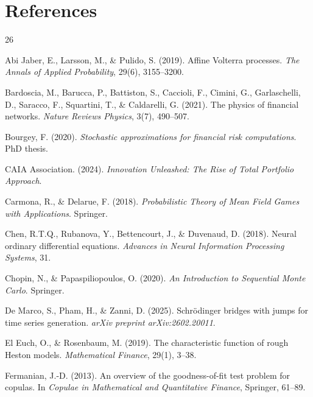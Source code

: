 \documentclass[11pt,a4paper]{article}
\begin{document}
\section*{References}
\renewcommand{\section}[2]{}

\begin{thebibliography}{26}

Abi Jaber, E., Larsson, M., \& Pulido, S. (2019).
Affine Volterra processes.
\emph{The Annals of Applied Probability}, 29(6), 3155--3200.

Bardoscia, M., Barucca, P., Battiston, S., Caccioli, F., Cimini, G.,
Garlaschelli, D., Saracco, F., Squartini, T., \& Caldarelli, G. (2021).
The physics of financial networks.
\emph{Nature Reviews Physics}, 3(7), 490--507.

Bourgey, F. (2020).
\emph{Stochastic approximations for financial risk computations}.
PhD thesis.

CAIA Association. (2024).
\emph{Innovation Unleashed: The Rise of Total Portfolio Approach}.

Carmona, R., \& Delarue, F. (2018).
\emph{Probabilistic Theory of Mean Field Games with Applications}.
Springer.

Chen, R.T.Q., Rubanova, Y., Bettencourt, J., \& Duvenaud, D. (2018).
Neural ordinary differential equations.
\emph{Advances in Neural Information Processing Systems}, 31.

Chopin, N., \& Papaspiliopoulos, O. (2020).
\emph{An Introduction to Sequential Monte Carlo}. Springer.

De Marco, S., Pham, H., \& Zanni, D. (2025).
Schr\"{o}dinger bridges with jumps for time series generation.
\emph{arXiv preprint arXiv:2602.20011}.

El Euch, O., \& Rosenbaum, M. (2019).
The characteristic function of rough Heston models.
\emph{Mathematical Finance}, 29(1), 3--38.

Fermanian, J.-D. (2013).
An overview of the goodness-of-fit test problem for copulas.
In \emph{Copulae in Mathematical and Quantitative Finance},
Springer, 61--89.


\end{thebibliography}
\end{document}
